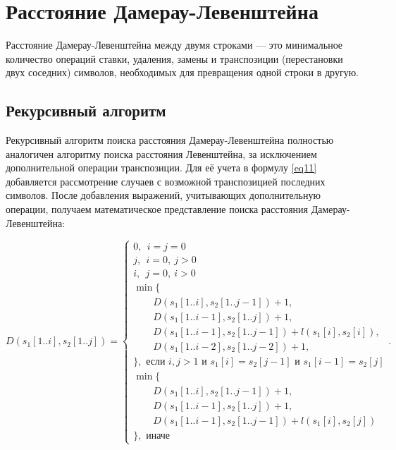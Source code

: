 \section{Расстояние Дамерау-Левенштейна}

Расстояние Дамерау-Левенштейна\cite{distances} между двумя строками --- это
минимальное количество операций ставки, удаления, замены и транспозиции
(перестановки двух соседних) символов, необходимых для превращения одной строки
в другую.

\subsection{Рекурсивный алгоритм}

Рекурсивный алгоритм поиска расстояния Дамерау-Левенштейна полностью аналогичен
алгоритму поиска расстояния Левенштейна, за исключением дополнительной операции
транспозиции. Для её учета в формулу \ref{eq11} добавляется рассмотрение
случаев с возможной транспозицией последних символов. После добавления
выражений, учитывающих дополнительную операции, получаем математическое
представление поиска расстояния Дамерау-Левенштейна:

{\small
\begin{equation}\label{eq13}
D(s_1[1..i],s_2[1..j]) =
    \begin{cases}
        0,~~i=j=0\\
        j,~~i=0,~j>0\\
        i,~~j=0,~i>0\\
        \min \{\\
         \qquad D(s_1[1..i],s_2[1..j - 1])+1,\\
         \qquad D(s_1[1..i-1],s_2[1..j])+1,\\
         \qquad D(s_1[1..i-1],s_2[1..j-1]) + l(s_1[i],s_2[i]), \\
         \qquad D(s_1[1..i-2],s_2[1..j-2]) + 1,\\
        \}, \text{ если } i,j > 1 \text{ и } s_1[i]=s_2[j-1] \text{ и }
            s_1[i-1]=s_2[j]\\
        \min \{\\
         \qquad D(s_1[1..i],s_2[1..j-1]) + 1,\\
         \qquad D(s_1[1..i-1],s_2[1..j]) + 1,\\
         \qquad D(s_1[1..i-1],s_2[1..j-1]) + l(s_1[i], s_2[j])\\
        \}, \text{ иначе}
    \end{cases}.
\end{equation}
}

